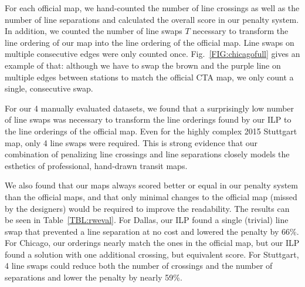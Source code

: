 \documentclass[sigconf]{acmart}
\begin{document}
For each official map, we hand-counted the number of line crossings as well as the number of line separations and calculated the overall score in our penalty system. In addition, we counted the number of line swaps $T$ necessary to transform the line ordering of our map into the line ordering of the official map. Line swaps on multiple consecutive edges were only counted once. Fig.~\ref{FIG:chicagofull} gives an example of that: although we have to swap the brown and the purple line on multiple edges between stations to match the official CTA map, we only count a single, consecutive swap. 

For our 4 manually evaluated datasets, we found that a surprisingly low number of line swaps was necessary to transform the line orderings found by our ILP to the line orderings of the official map. Even for the highly complex 2015 Stuttgart map, only 4 line swaps were required. This is strong evidence that our combination of penalizing line crossings and line separations closely models the esthetics of professional, hand-drawn transit maps.

We also found that our maps always scored better or equal in our penalty system than the official maps, and that only minimal changes to the official map (missed by the designers) would be required to improve the readability. The results can be seen in Table~\ref{TBL:rweval}. For Dallas, our ILP found a single (trivial) line swap that prevented a line separation at no cost and lowered the penalty by 66\%. For Chicago, our orderings nearly match the ones in the official map, but our ILP found a solution with one additional crossing, but equivalent score. For Stuttgart, 4 line swaps could reduce both the number of crossings and the number of separations and lower the penalty by nearly 59\%.
\end{document}
